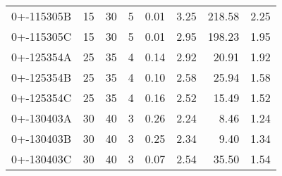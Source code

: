 \begin{scriptsize}
\begin{table}[h]
\begin{tabular*}{\linewidth}{@{\extracolsep{\fill}}lrrrrrrr@{}}
0+-115305B & \num{15} & \num{30} & \num{5} & \num{0.01} & \num{3.25} & \num{218.58} & \num{2.25} \\ 
0+-115305C & \num{15} & \num{30} & \num{5} & \num{0.01} & \num{2.95} & \num{198.23} & \num{1.95} \\ 
0+-125354A & \num{25} & \num{35} & \num{4} & \num{0.14} & \num{2.92} & \num{20.91} & \num{1.92} \\ 
0+-125354B & \num{25} & \num{35} & \num{4} & \num{0.10} & \num{2.58} & \num{25.94} & \num{1.58} \\ 
0+-125354C & \num{25} & \num{35} & \num{4} & \num{0.16} & \num{2.52} & \num{15.49} & \num{1.52} \\ 
0+-130403A & \num{30} & \num{40} & \num{3} & \num{0.26} & \num{2.24} & \num{8.46} & \num{1.24} \\ 
0+-130403B & \num{30} & \num{40} & \num{3} & \num{0.25} & \num{2.34} & \num{9.40} & \num{1.34} \\ 
0+-130403C & \num{30} & \num{40} & \num{3} & \num{0.07} & \num{2.54} & \num{35.50} & \num{1.54} \\ 
\bottomrule
\end{tabular*} 
\vspace*{-1cm}
\end{table}
 \end{scriptsize} 